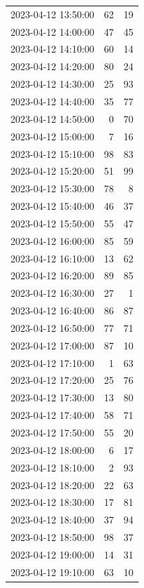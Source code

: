 \documentclass[
  letterpaper,
  DIV=11,
  numbers=noendperiod]{scrartcl}
\begin{document}
\begin{tabular}{lrr}
2023-04-12 13:50:00 &    62 &    19 \\
2023-04-12 14:00:00 &    47 &    45 \\
2023-04-12 14:10:00 &    60 &    14 \\
2023-04-12 14:20:00 &    80 &    24 \\
2023-04-12 14:30:00 &    25 &    93 \\
2023-04-12 14:40:00 &    35 &    77 \\
2023-04-12 14:50:00 &     0 &    70 \\
2023-04-12 15:00:00 &     7 &    16 \\
2023-04-12 15:10:00 &    98 &    83 \\
2023-04-12 15:20:00 &    51 &    99 \\
2023-04-12 15:30:00 &    78 &     8 \\
2023-04-12 15:40:00 &    46 &    37 \\
2023-04-12 15:50:00 &    55 &    47 \\
2023-04-12 16:00:00 &    85 &    59 \\
2023-04-12 16:10:00 &    13 &    62 \\
2023-04-12 16:20:00 &    89 &    85 \\
2023-04-12 16:30:00 &    27 &     1 \\
2023-04-12 16:40:00 &    86 &    87 \\
2023-04-12 16:50:00 &    77 &    71 \\
2023-04-12 17:00:00 &    87 &    10 \\
2023-04-12 17:10:00 &     1 &    63 \\
2023-04-12 17:20:00 &    25 &    76 \\
2023-04-12 17:30:00 &    13 &    80 \\
2023-04-12 17:40:00 &    58 &    71 \\
2023-04-12 17:50:00 &    55 &    20 \\
2023-04-12 18:00:00 &     6 &    17 \\
2023-04-12 18:10:00 &     2 &    93 \\
2023-04-12 18:20:00 &    22 &    63 \\
2023-04-12 18:30:00 &    17 &    81 \\
2023-04-12 18:40:00 &    37 &    94 \\
2023-04-12 18:50:00 &    98 &    37 \\
2023-04-12 19:00:00 &    14 &    31 \\
2023-04-12 19:10:00 &    63 &    10 \\

\end{tabular}
\end{document}
